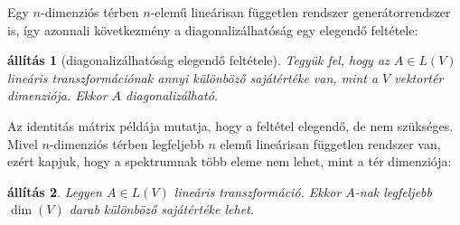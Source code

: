 \documentclass[a4paper, showtrims]{memoir}
\theoremstyle{plain}
\newtheorem{proposition}{állítás}[chapter]
\theoremstyle{remark}
\theoremstyle{definition}
\begin{document}
Egy $n$-dimenziós térben $n$-elemű lineárisan független rendszer generátorrendszer is, így
azonnali következmény a diagonalizálhatóság egy elegendő feltétele:
\begin{proposition}[diagonalizálhatóság elegendő feltétele]
	Tegyük fel, hogy az $A\in L\left( V \right)$ lineáris transzformációnak annyi különböző sajátértéke van,
	mint a $V$ vektortér dimenziója.
	Ekkor $A$ diagonalizálható.
\end{proposition}
Az identitás mátrix példája mutatja, hogy a feltétel elegendő, de nem szükséges.
Mivel $n$-dimenziós térben legfeljebb $n$ elemű lineárisan független rendszer van,
ezért kapjuk, hogy a spektrumnak több eleme nem lehet, mint a tér dimenziója:
\begin{proposition}
	Legyen $A\in L\left( V \right)$ lineáris transzformáció.
	Ekkor $A$-nak legfeljebb $\dim(V)$ darab különböző sajátértéke lehet.
\end{proposition}
\end{document}
